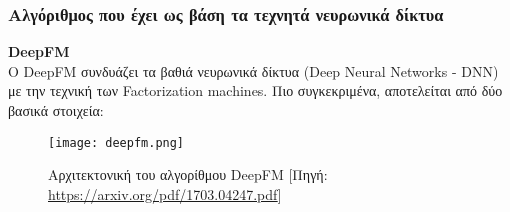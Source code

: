 \subsubsection{Αλγόριθμος που έχει ως βάση τα τεχνητά νευρωνικά δίκτυα}
\noindent\textbf{DeepFM}\\
O DeepFM \cite{guoDeepFMFactorizationmachineBased2017}  συνδυάζει τα βαθιά νευρωνικά δίκτυα (Deep Neural Networks - DNN) με την τεχνική των Factorization machines. Πιο συγκεκριμένα, αποτελείται από δύο βασικά στοιχεία:
\begin{figure}[H]
	\centering
	\texttt{[image: deepfm.png]}
	\caption[Αρχιτεκτονική του αλγορίθμου DeepFM]{Αρχιτεκτονική του αλγορίθμου DeepFM [Πηγή: \url{https://arxiv.org/pdf/1703.04247.pdf}]}
	\label{fig:deepfm}
\end{figure}
